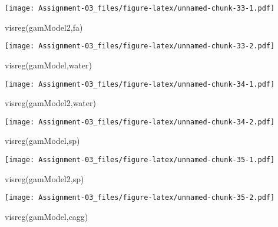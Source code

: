 \documentclass[
]{article}
\newenvironment{Shaded}{\begin{snugshade}}{\end{snugshade}}
\newcommand{\FunctionTok}[1]{\textcolor[rgb]{0.00,0.00,0.00}{#1}}
\newcommand{\NormalTok}[1]{#1}
\newcommand{\StringTok}[1]{\textcolor[rgb]{0.31,0.60,0.02}{#1}}
\begin{document}
\texttt{[image: Assignment-03\_files/figure-latex/unnamed-chunk-33-1.pdf]}

\begin{Shaded}
\begin{Highlighting}[]
\FunctionTok{visreg}\NormalTok{(gamModel2,}\StringTok{\textquotesingle{}fa\textquotesingle{}}\NormalTok{)}
\end{Highlighting}
\end{Shaded}

\texttt{[image: Assignment-03\_files/figure-latex/unnamed-chunk-33-2.pdf]}

\begin{Shaded}
\begin{Highlighting}[]
\FunctionTok{visreg}\NormalTok{(gamModel,}\StringTok{\textquotesingle{}water\textquotesingle{}}\NormalTok{) }
\end{Highlighting}
\end{Shaded}

\texttt{[image: Assignment-03\_files/figure-latex/unnamed-chunk-34-1.pdf]}

\begin{Shaded}
\begin{Highlighting}[]
\FunctionTok{visreg}\NormalTok{(gamModel2,}\StringTok{\textquotesingle{}water\textquotesingle{}}\NormalTok{)}
\end{Highlighting}
\end{Shaded}

\texttt{[image: Assignment-03\_files/figure-latex/unnamed-chunk-34-2.pdf]}

\begin{Shaded}
\begin{Highlighting}[]
\FunctionTok{visreg}\NormalTok{(gamModel,}\StringTok{\textquotesingle{}sp\textquotesingle{}}\NormalTok{) }
\end{Highlighting}
\end{Shaded}

\texttt{[image: Assignment-03\_files/figure-latex/unnamed-chunk-35-1.pdf]}

\begin{Shaded}
\begin{Highlighting}[]
\FunctionTok{visreg}\NormalTok{(gamModel2,}\StringTok{\textquotesingle{}sp\textquotesingle{}}\NormalTok{)}
\end{Highlighting}
\end{Shaded}

\texttt{[image: Assignment-03\_files/figure-latex/unnamed-chunk-35-2.pdf]}

\begin{Shaded}
\begin{Highlighting}[]
\FunctionTok{visreg}\NormalTok{(gamModel,}\StringTok{\textquotesingle{}cagg\textquotesingle{}}\NormalTok{) }
\end{Highlighting}
\end{Shaded}
\end{document}
